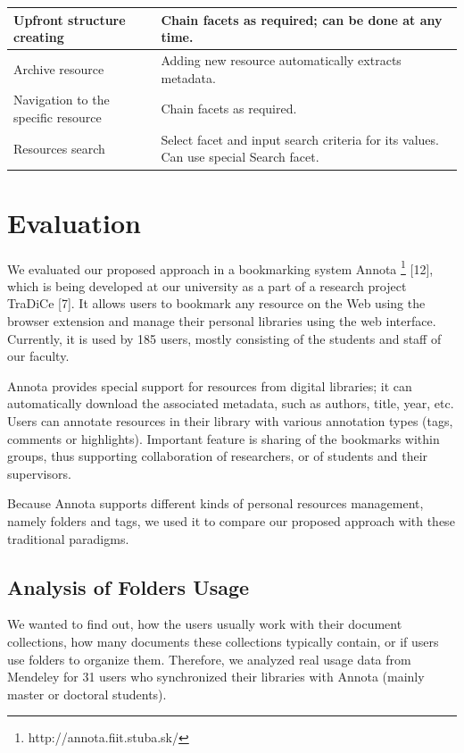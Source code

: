 \documentclass[12pt]{article}
\begin{document}
\begin{table}[]
\begin{tabular}{ll}
Upfront structure creating                                 & Chain facets as required; can be done at any time.                                                                                       \\ \hline
Archive resource                                           & Adding new resource automatically extracts metadata.                                                                                     \\ \hline
Navigation to the specific resource                        & Chain facets as required.                                                                                                                \\ \hline
Resources search                                           & Select facet and input search criteria for its values. Can use special Search facet.                                                     \\ \hline
\end{tabular}
\end{table}
 
\section{Evaluation}
We evaluated our proposed approach in a bookmarking system Annota \footnote{http://annota.fiit.stuba.sk/} [12], which is being developed at our university as a part of a research project TraDiCe [7]. It allows users to bookmark any resource on the Web using the browser extension and manage their personal libraries using the web interface. Currently, it is used by 185 users, mostly consisting of the students and staff of our faculty.

 Annota provides special support for resources from digital libraries; it can automatically download the associated metadata, such as authors, title, year, etc. Users can annotate resources in their library with various annotation types (tags, comments or highlights). Important feature is sharing of the bookmarks within groups, thus supporting collaboration of researchers, or of students and their supervisors.
 
  Because Annota supports different kinds of personal resources management, namely folders and tags, we used it to compare our proposed approach with these traditional paradigms. 
  
\subsection{Analysis of Folders Usage }
 We wanted to find out, how the users usually work with their document collections, how many documents these collections typically contain, or if users use folders to organize them. Therefore, we analyzed real usage data from Mendeley for 31 users who synchronized their libraries with Annota (mainly master or doctoral students).
 
\end{document}
